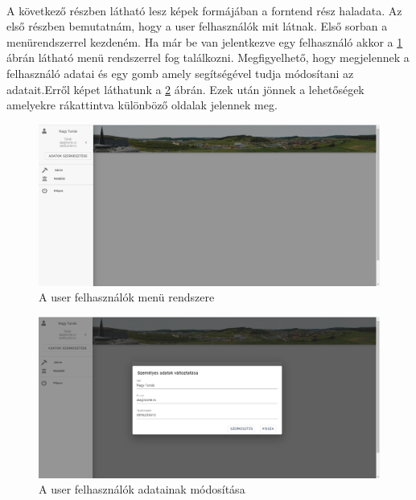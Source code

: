 	\paragraph{}
	A következő részben látható lesz képek formájában a forntend rész haladata. Az első részben bemutatnám, hogy a user felhasználók mit látnak. Első sorban a menürendszerrel kezdeném. Ha már be van jelentkezve egy felhasználó akkor a \ref{fig:drawbar} ábrán látható menü rendszerrel fog találkozni. Megfigyelhető, hogy megjelennek a felhasználó adatai és egy gomb amely segítségével tudja módosítani az adatait.Erről képet láthatunk a \ref{fig:changedata} ábrán. Ezek után jönnek a lehetőségek amelyekre rákattintva különböző oldalak jelennek meg.
	\begin{figure}
		\centering
		\includegraphics[scale=0.4]{figures/images/drawbar.png}
		\caption{A user felhasználók menü rendszere}
		\label{fig:drawbar}
	\end{figure}
	\begin{figure}
		\centering
		\includegraphics[scale=0.4]{figures/images/changedata.png}
		\caption{A user felhasználók adatainak módosítása}
		\label{fig:changedata}
	\end{figure}
	
